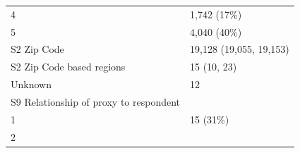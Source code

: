 \documentclass[]{article}
\begin{document}
\begin{longtable}[]{@{}ll@{}}
\begin{minipage}[t]{0.71\columnwidth}\raggedright
4\strut
\end{minipage} & \begin{minipage}[t]{0.23\columnwidth}\raggedright
1,742 (17\%)\strut
\end{minipage}\tabularnewline
\begin{minipage}[t]{0.71\columnwidth}\raggedright
5\strut
\end{minipage} & \begin{minipage}[t]{0.23\columnwidth}\raggedright
4,040 (40\%)\strut
\end{minipage}\tabularnewline
\begin{minipage}[t]{0.71\columnwidth}\raggedright
S2 Zip Code\strut
\end{minipage} & \begin{minipage}[t]{0.23\columnwidth}\raggedright
19,128 (19,055, 19,153)\strut
\end{minipage}\tabularnewline
\begin{minipage}[t]{0.71\columnwidth}\raggedright
S2 Zip Code based regions\strut
\end{minipage} & \begin{minipage}[t]{0.23\columnwidth}\raggedright
15 (10, 23)\strut
\end{minipage}\tabularnewline
\begin{minipage}[t]{0.71\columnwidth}\raggedright
Unknown\strut
\end{minipage} & \begin{minipage}[t]{0.23\columnwidth}\raggedright
12\strut
\end{minipage}\tabularnewline
\begin{minipage}[t]{0.71\columnwidth}\raggedright
S9 Relationship of proxy to respondent\strut
\end{minipage} & \begin{minipage}[t]{0.23\columnwidth}\raggedright
\strut
\end{minipage}\tabularnewline
\begin{minipage}[t]{0.71\columnwidth}\raggedright
1\strut
\end{minipage} & \begin{minipage}[t]{0.23\columnwidth}\raggedright
15 (31\%)\strut
\end{minipage}\tabularnewline
\begin{minipage}[t]{0.71\columnwidth}\raggedright
2\strut
\end{minipage} & \begin{minipage}[t]{0.23\columnwidth}\raggedright

\end{minipage}
\end{longtable}
\end{document}

